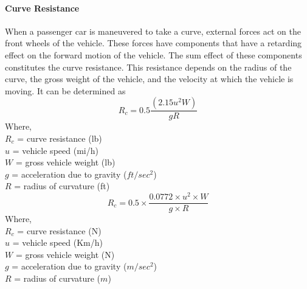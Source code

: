 \paragraph{Curve Resistance}
When a passenger car is maneuvered to take a curve, external forces act on the front wheels of the vehicle. These forces have components that have a retarding effect on the forward motion of the vehicle. The sum effect of these components constitutes the curve resistance. This resistance depends on the radius of the curve, the gross weight of the vehicle, and the velocity at which the vehicle is moving. It can be determined as
\begin{equation}
	R_c = 0.5 \frac{(2.15 u^2 W)}{gR}
\end{equation}
Where,\\
\hspace*{10mm}$R_c$ = curve resistance (lb)\\
\hspace*{10mm}$u$ = vehicle speed (mi/h)\\
\hspace*{10mm}$W$ = gross vehicle weight (lb)\\
\hspace*{10mm}$g$ = acceleration due to gravity ($ft/sec^2$)\\
\hspace*{10mm}$R$ = radius of curvature (ft)
\begin{equation}
	R_c = 0.5 \times \frac{0.0772 \times u^2 \times W}{g \times R}
\end{equation}
Where,\\
\hspace*{10mm}$R_c$ = curve resistance (N)\\
\hspace*{10mm}$u$ = vehicle speed (Km/h)\\
\hspace*{10mm}$W$ = gross vehicle weight (N)\\
\hspace*{10mm}$g$ = acceleration due to gravity ($m/sec^2$)\\
\hspace*{10mm}$R$ = radius of curvature ($ m $)
